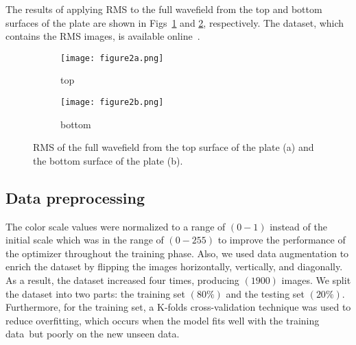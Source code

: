 \documentclass[runningheads]{llncs}
\begin{document}
The results of applying RMS to the full wavefield from the top and bottom surfaces of the plate are shown in Figs~\ref{fig:rmstop} and \ref{fig:rmsbottom}, respectively.
The dataset, which contains the RMS images, is available online~\cite{Kudela2020d}.
\begin{figure} [h!]
	\centering
	\begin{subfigure}[b]{0.47\textwidth}
		\centering
		\texttt{[image: figure2a.png]}
		\caption{top}
		\label{fig:rmstop}
	\end{subfigure}
	\hfill
	\begin{subfigure}[b]{0.47\textwidth}
		\centering
		\texttt{[image: figure2b.png]}
		\caption{bottom}
		\label{fig:rmsbottom}
	\end{subfigure}
	\caption{RMS of the full wavefield from the top surface of the plate (a) and the bottom surface of the plate (b).}
	\label{fig:rms}
\end{figure} 
\subsection{Data preprocessing}
The color scale values were normalized to a range of \((0-1)\) instead of the initial scale which was in the range of \((0 - 255)\) to improve the performance of the optimizer throughout the training phase.
Also, we used data augmentation to enrich the dataset by flipping the images horizontally, vertically, and diagonally.
As a result, the dataset increased four times, producing \((1900)\) images.
We split the dataset into two parts: the training set \((80\%)\) and the testing set \((20\%)\).
Furthermore, for the training set, a K-folds cross-validation technique was used to reduce overfitting, which occurs when the model fits well with the training data but poorly on the new unseen data.
\end{document}
